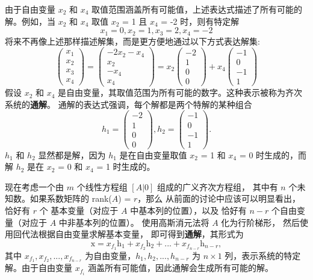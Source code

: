 由于自由变量 \(x_2\) 和 \(x_4\) 取值范围涵盖所有可能值，上述表达式描述了所有可能的解。例如，当 \(x_2\) 和 \(x_4\) 取值
\(x_2\) = 1 且 \(x_4\) = -2 时，则有特定解
\[
x_1 = 0, x_2 = 1, x_3 = 2, x_4 = -2
\]
将来不再像上述那样描述解集，而是更方便地通过以下方式表达解集: 
\[
\left(\begin{array}{cols}
x_1\\
x_2\\
x_3\\
x_4
\end{array}\right)=
\left(\begin{array}{cols}
-2x_2 - x_4\\
x_2\\
-x_4\\
x_4
\end{array}\right)=
x_2\left(\begin{array}{cols}
-2\\
1\\
0\\
0
\end{array}\right)+
x_4\left(\begin{array}{cols}
-1\\
0\\
-1\\
1
\end{array}\right)
\]
假设 \(x_2\) 和 \(x_4\) 是自由变量，其取值范围为所有可能的数字。这种表示被称为齐次系统的\textbf{通解}。
通解的表达式强调，每个解都是两个特解的某种组合
\[
h_1 = 
\left(\begin{array}{cols}
-2\\
1\\
0\\
0
\end{array}\right),  
h_2 =
\left(\begin{array}{cols}
-1\\
0\\
-1\\
1
\end{array}\right).
\]
\(h_1\) 和 \(h_2\) 显然都是解，因为 \(h_1\) 是在自由变量取值 \(x_2\) = 1 和 \(x_4\) = 0 时生成的，而
解 \(h_2\) 是在 \(x_2\) = 0 和 \(x_4\) = 1 时生成的。

现在考虑一个由 \(m\) 个线性方程组 \([A|0]\) 组成的广义齐次方程组，
其中有 \(n\) 个未知数。如果系数矩阵的 rank(\(A\)) = \(r\)，那么
从前面的讨论中应该可以明显看出，恰好有 \(r\) 个
基本变量（对应于 \(A\) 中基本列的位置），以及
恰好有 \(n - r\) 个自由变量（对应于 \(A\) 中非基本列的位置）。
使用高斯消元法将 \(A\) 化为行阶梯形，
然后使用回代法根据自由变量求解基本变量，
即可得到\textbf{通解}，其形式为
\[
\mathrm{x} = x_{f_1}\mathrm{h}_1 + x_{f_2}\mathrm{h}_2 + ... + x_{f_{n-r}}\mathrm{h}_{n-r},
\]
其中 \(x_{f_1}, x_{f_2}, ..., x_{f_{n-r}}\) 为自由变量，\(h_1, h_2, ..., h_{n-r}\) 为
\(n \times 1\) 列，表示系统的特定解。由于自由变量 \(x_{f_i}\) 涵盖所有可能值，因此通解会生成所有可能的解。

